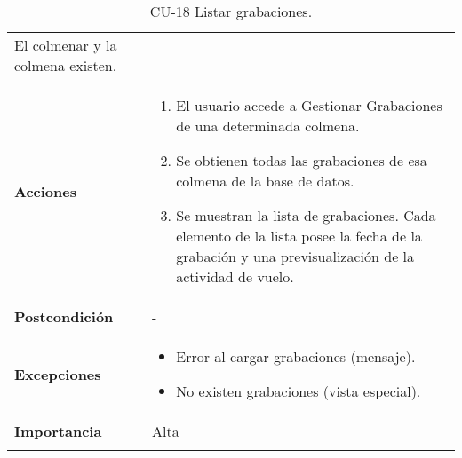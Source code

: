 \begin{longtable}[H]{@{}ll@{}}
\begin{minipage}[t]{0.68\columnwidth}
El colmenar y la colmena existen.\strut
\end{minipage}\tabularnewline
\begin{minipage}[t]{0.26\columnwidth}\raggedright\strut
\textbf{Acciones}\strut
\end{minipage} & \begin{minipage}[t]{0.68\columnwidth}\raggedright\strut
\begin{enumerate}
\def\labelenumi{\arabic{enumi}.}
\tightlist
\item
  El usuario accede a Gestionar Grabaciones de una determinada colmena.
\item
  Se obtienen todas las grabaciones de esa colmena de la base de datos.
\item
  Se muestran la lista de grabaciones. Cada elemento de la lista posee
  la fecha de la grabación y una previsualización de la actividad de
  vuelo.
\end{enumerate}\strut
\end{minipage}\tabularnewline
\begin{minipage}[t]{0.26\columnwidth}\raggedright\strut
\textbf{Postcondición}\strut
\end{minipage} & \begin{minipage}[t]{0.68\columnwidth}\raggedright\strut
-\strut
\end{minipage}\tabularnewline
\begin{minipage}[t]{0.26\columnwidth}\raggedright\strut
\textbf{Excepciones}\strut
\end{minipage} & \begin{minipage}[t]{0.68\columnwidth}\raggedright\strut
\begin{itemize}
\tightlist
\item
  Error al cargar grabaciones (mensaje).
\item
  No existen grabaciones (vista especial).
\end{itemize}\strut
\end{minipage}\tabularnewline
\begin{minipage}[t]{0.26\columnwidth}\raggedright\strut
\textbf{Importancia}\strut
\end{minipage} & \begin{minipage}[t]{0.68\columnwidth}\raggedright\strut
Alta\strut
\end{minipage}\tabularnewline
\bottomrule
\caption{CU-18 Listar grabaciones.}
\end{longtable}

